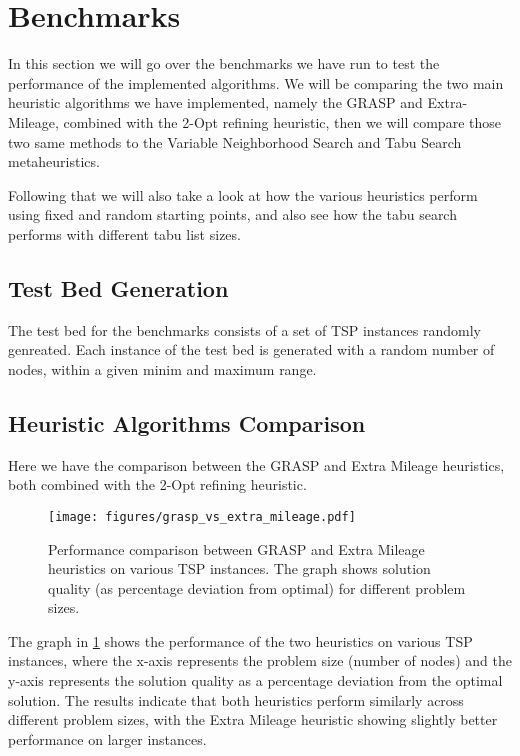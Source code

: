 \documentclass{article}
\begin{document}
\section{Benchmarks}
In this section we will go over the benchmarks we have run to test the performance of the implemented algorithms. 
We will be comparing the two main heuristic algorithms we have implemented, namely the GRASP and Extra-Mileage, combined with the 2-Opt refining heuristic, 
then we will compare those two same methods to the Variable Neighborhood Search and Tabu Search metaheuristics.

Following that we will also take a look at how the various heuristics perform using fixed and random starting points, and also see how 
the tabu search performs with different tabu list sizes.

\subsection{Test Bed Generation}
The test bed for the benchmarks consists of a set of TSP instances randomly genreated. Each instance of the test bed is generated with a random number of nodes, 
within a given minim and maximum range. 

\subsection{Heuristic Algorithms Comparison}
Here we have the comparison between the GRASP and Extra Mileage heuristics, both combined with the 2-Opt refining heuristic.
\begin{figure}[ht]
	\centering
	\texttt{[image: figures/grasp\_vs\_extra\_mileage.pdf]}
	\caption{Performance comparison between GRASP and Extra Mileage heuristics on various TSP instances. The graph shows solution quality (as percentage deviation from optimal) for different problem sizes.}
	\label{fig:grasp_vs_extra_mileage}
\end{figure}
The graph in \ref{fig:grasp_vs_extra_mileage} shows the performance of the two heuristics on various TSP instances, 
where the x-axis represents the problem size (number of nodes) and the y-axis represents the solution quality as a percentage deviation from the optimal solution. 
The results indicate that both heuristics perform similarly across different problem sizes, with the Extra Mileage heuristic showing slightly better performance on larger instances.
\end{document}
